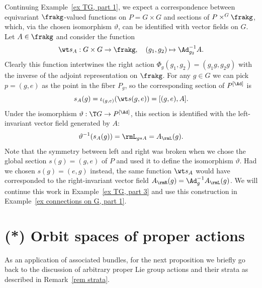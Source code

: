 \begin{example}\label{ex TG, part 2}
    Continuing Example~\ref{ex TG, part 1}, we expect a correspondence between equivariant $\frakg$-valued functions on $P=G\times G$ and sections of $P\times^G \frakg$, which, via the chosen isomorphism $\vartheta$, can be identified with vector fields on $G$. Let $A\in\frakg$ and consider the function
    \[\wt s_A:G\times G\to \frakg,\quad (g_1,g_2)\mapsto \Ad_{g_2}^{-1}A.\]
    Clearly this function intertwines the right action $\Phi_g(g_1,g_2)=(g_1g,g_2g)$ with the inverse of the adjoint representation on $\frakg$. For any $g\in G$ we can pick $p=(g,e)$ as the point in the fiber $P_g$, so the corresponding section of $P^{[\Ad]}$ is 
    \[s_A(g)=\iota_{(g,e)}(\wt s(g,e))=[(g,e),A].\]
    Under the isomorphism $\vartheta:\T G\to P^{[\Ad]}$, this section is identified with the left-invariant vector field generated by $A$:
    \[\vartheta^{-1}(s_A(g))=\rmL_{g\ast A}=A_\rmL(g).\]
    Note that the symmetry between left and right was broken when we chose the global section $s(g)=(g,e)$ of $P$ and used it to define the isomorphism $\vartheta$. Had we chosen $s(g)=(e,g)$ instead, the same function $\wt s_A$ would have corresponded to the right-invariant vector field $A_\rmR(g)=\Ad_g^{-1} A_\rmL(g)$. We will continue this work in Example~\ref{ex TG, part 3} and use this construction in Example~\ref{ex connections on G, part 1}.
\end{example}





\section{(*) Orbit spaces of proper actions}

As an application of associated bundles, for the next proposition we briefly go back to the discussion of arbitrary proper Lie group actions and their strata as described in Remark~\ref{rem strata}.

